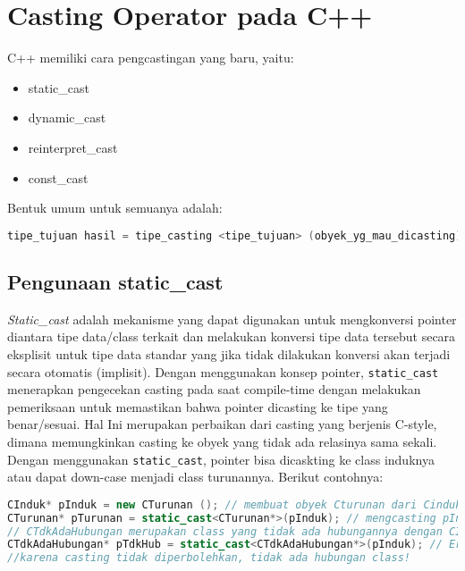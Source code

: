 \section{Casting Operator pada C++}\label{casting-operator-pada-c}

C++ memiliki cara pengcastingan yang baru, yaitu:

\begin{itemize}

\item
  static\_cast
\item
  dynamic\_cast
\item
  reinterpret\_cast
\item
  const\_cast
\end{itemize}

Bentuk umum untuk semuanya adalah:

\begin{lstlisting}[language=c++, numbers=none]
tipe_tujuan hasil = tipe_casting <tipe_tujuan> (obyek_yg_mau_dicasting);
\end{lstlisting}

\subsection{Pengunaan static\_cast}\label{pengunaan-staticux5fcast}

\emph{Static\_cast} adalah mekanisme yang dapat digunakan untuk
mengkonversi pointer diantara tipe data/class terkait dan melakukan
konversi tipe data tersebut secara eksplisit untuk tipe data standar
yang jika tidak dilakukan konversi akan terjadi secara otomatis
(implisit). Dengan menggunakan konsep pointer, \texttt{static\_cast}
menerapkan pengecekan casting pada saat compile-time dengan melakukan
pemeriksaan untuk memastikan bahwa pointer dicasting ke tipe yang
benar/sesuai. Hal Ini merupakan perbaikan dari casting yang berjenis
C-style, dimana memungkinkan casting ke obyek yang tidak ada relasinya
sama sekali. Dengan menggunakan \texttt{static\_cast}, pointer bisa
dicaskting ke class induknya atau dapat down-case menjadi class
turunannya. Berikut contohnya:

\begin{lstlisting}[language=c++, numbers=none]
CInduk* pInduk = new CTurunan (); // membuat obyek Cturunan dari Cinduk (polymorfisme)
CTurunan* pTurunan = static_cast<CTurunan*>(pInduk); // mengcasting pInduk menjadi Cturunan, valid!
// CTdkAdaHubungan merupakan class yang tidak ada hubungannya dengan CInduk melalui inheritance
CTdkAdaHubungan* pTdkHub = static_cast<CTdkAdaHubungan*>(pInduk); // Error
//karena casting tidak diperbolehkan, tidak ada hubungan class!
\end{lstlisting}

